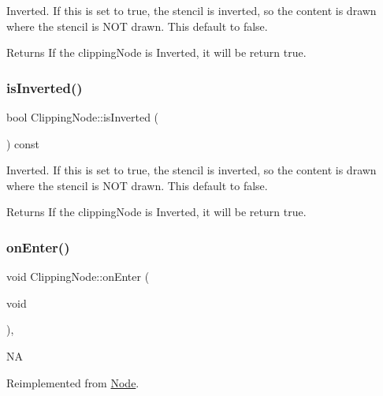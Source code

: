 Inverted. If this is set to true, the stencil is inverted, so the content is drawn where the stencil is N\+OT drawn. This default to false.

\begin{DoxyReturn}{Returns}
If the clipping\+Node is Inverted, it will be return true. 
\end{DoxyReturn}
\mbox{\label{classClippingNode_add176fbe7d1ef979d93ed5918159654f}} 
\subsubsection{\texorpdfstring{is\+Inverted()}{isInverted()}\hspace{0.1cm}{\footnotesize\ttfamily [2/2]}}
{\footnotesize\ttfamily bool Clipping\+Node\+::is\+Inverted (\begin{DoxyParamCaption}{ }\end{DoxyParamCaption}) const}

Inverted. If this is set to true, the stencil is inverted, so the content is drawn where the stencil is N\+OT drawn. This default to false.

\begin{DoxyReturn}{Returns}
If the clipping\+Node is Inverted, it will be return true. 
\end{DoxyReturn}
\mbox{\label{classClippingNode_abf21272a53da13366c78ec704f0e0cd3}} 
\subsubsection{\texorpdfstring{on\+Enter()}{onEnter()}\hspace{0.1cm}{\footnotesize\ttfamily [1/2]}}
{\footnotesize\ttfamily void Clipping\+Node\+::on\+Enter (\begin{DoxyParamCaption}\item[{void}]{ }\end{DoxyParamCaption})\hspace{0.3cm}{\ttfamily [override]}, {\ttfamily [virtual]}}

NA 

Reimplemented from \hyperlink{classNode_a7f51764c4afd5018a052b9ef71c03374}{Node}.

